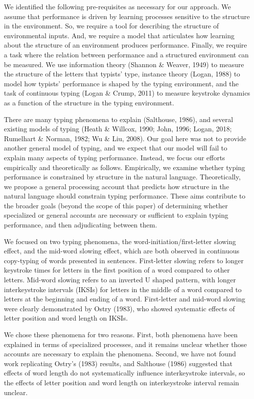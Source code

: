 \documentclass[,man,floatsintext]{apa6}
\begin{document}
We identified the following pre-requisites as necessary for our approach. We assume that performance is driven by learning processes sensitive to the structure in the environment. So, we require a tool for describing the structure of environmental inputs. And, we require a model that articulates how learning about the structure of an environment produces performance. Finally, we require a task where the relation between performance and a structured environment can be measured. We use information theory (Shannon \& Weaver, 1949) to measure the structure of the letters that typists' type, instance theory (Logan, 1988) to model how typists' performance is shaped by the typing environment, and the task of continuous typing (Logan \& Crump, 2011) to measure keystroke dynamics as a function of the structure in the typing environment.

There are many typing phenomena to explain (Salthouse, 1986), and several existing models of typing (Heath \& Willcox, 1990; John, 1996; Logan, 2018; Rumelhart \& Norman, 1982; Wu \& Liu, 2008). Our goal here was not to provide another general model of typing, and we expect that our model will fail to explain many aspects of typing performance. Instead, we focus our efforts empirically and theoretically as follows. Empirically, we examine whether typing performance is constrained by structure in the natural language. Theoretically, we propose a general processing account that predicts how structure in the natural language should constrain typing performance. These aims contribute to the broader goals (beyond the scope of this paper) of determining whether specialized or general accounts are necessary or sufficient to explain typing performance, and then adjudicating between them.

We focused on two typing phenomena, the word-initiation/first-letter slowing effect, and the mid-word slowing effect, which are both observed in continuous copy-typing of words presented in sentences. First-letter slowing refers to longer keystroke times for letters in the first position of a word compared to other letters. Mid-word slowing refers to an inverted U shaped pattern, with longer interkeystroke intervals (IKSIs) for letters in the middle of a word compared to letters at the beginning and ending of a word. First-letter and mid-word slowing were clearly demonstrated by Ostry (1983), who showed systematic effects of letter position and word length on IKSIs.

We chose these phenomena for two reasons. First, both phenomena have been explained in terms of specialized processes, and it remains unclear whether those accounts are necessary to explain the phenomena. Second, we have not found work replicating Ostry's (1983) results, and Salthouse (1986) suggested that effects of word length do not systematically influence interkeystroke intervals, so the effects of letter position and word length on interkeystroke interval remain unclear.
\end{document}
